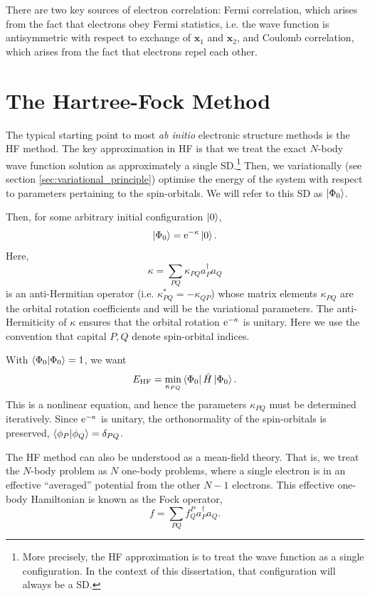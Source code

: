 There are two key sources of electron correlation: Fermi correlation, which arises from the fact that electrons obey Fermi statistics, i.e. the wave function is antisymmetric with respect to exchange of $\bm x_1$ and $\bm x_2$, and Coulomb correlation, which arises from the fact that electrons repel each other.

\section{The Hartree-Fock Method}
\label{sec:hf}

The typical starting point to most \emph{ab initio} electronic structure methods is the \gls{HF} method.\cite{hartreeWave1928,fockNaherungsmethode1930,slaterNote1930} The key approximation in \gls{HF} is that we treat the exact $N$-body wave function solution as approximately a single \gls{SD}.\footnote{More precisely, the \gls{HF} approximation is to treat the wave function as a single configuration. In the context of this dissertation, that configuration will always be a \gls{SD}.} Then, we variationally (see section \ref{sec:variational_principle}) optimise the energy of the system with respect to parameters pertaining to the spin-orbitals. We will refer to this \gls{SD} as $\ket{\Phi_0}$.

Then, for some arbitrary initial configuration $\ket 0$,
\begin{equation}
\ket{\Phi_0} = \mathrm{e}^{-\kappa} \ket 0.
\end{equation}
Here,
\begin{equation}
\kappa = \sum_{PQ} \kappa_{PQ}a_P^\dag a_Q
\end{equation}
is an anti-Hermitian operator (i.e. $\kappa_{PQ}^* = -\kappa_{QP}$) whose matrix elements $\kappa_{PQ}$ are the orbital rotation coefficients and will be the variational parameters. The anti-Hermiticity of $\kappa$ ensures that the orbital rotation $\mathrm{e}^{-\kappa}$ is unitary. Here we use the convention that capital $P,Q$ denote spin-orbital indices.

With $\braket{\Phi_0}=1$, we want
\begin{equation}
E_\mathrm{HF} = \min_{\kappa_{PQ}}\bra{\Phi_0}\hat H\ket{\Phi_0}.
\end{equation}
This is a nonlinear equation, and hence the parameters $\kappa_{PQ}$ must be determined iteratively. Since $\mathrm{e}^{-\kappa}$ is unitary, the orthonormality of the spin-orbitals is preserved, $\bra{\phi_P}\ket{\phi_Q} = \delta_{PQ}$.

The \gls{HF} method can also be understood as a mean-field theory. That is, we treat the $N$-body problem as $N$ one-body problems, where a single electron is in an effective ``averaged'' potential from the other $N-1$ electrons. This effective one-body Hamiltonian is known as the Fock operator,
\begin{equation}
    \label{eq:fock-operator}
    f = \sum_{PQ} f^P_{Q} a_P^\dag a_Q.
\end{equation}

